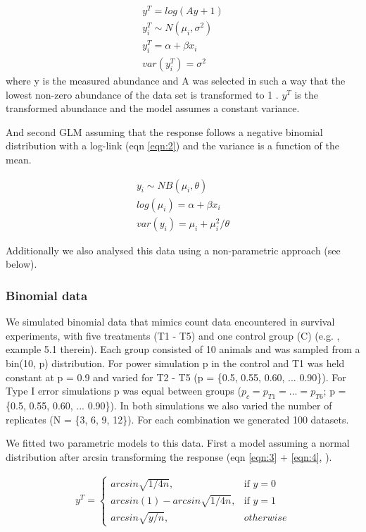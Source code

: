 \documentclass{scrartcl}\usepackage[]{graphicx}\usepackage[]{color}
\begin{document}
\begin{align}
  y^T = log(Ay + 1) \\
  y^T_i \sim N(\mu_i, \sigma^2) \nonumber \\
  y^T_i = \alpha + \beta x_i \label{eqn:1} \\
  var(y^T_i) = \sigma^2 \nonumber
\end{align}
where y is the measured abundance and A was selected in such a way that the lowest non-zero abundance of the data set is transformed to 1 \citep{van_den_brink_impact_2000}. 
$y^T$ is the transformed abundance and the model assumes a constant variance.

And second GLM assuming that the response follows a negative binomial distribution with a log-link (eqn \ref{eqn:2}) and
the variance is a function of the mean.

\begin{align}
  y_i \sim NB(\mu_i, \theta)  \nonumber \\
  log(\mu_i) = \alpha + \beta x_i   \label{eqn:2} \\
  var(y_i) = \mu_i + \mu_i^2 / \theta  \nonumber
\end{align}

Additionally we also analysed this data using a non-parametric approach (see below).

\subsubsection{Binomial data}
We simulated binomial data that mimics count data encountered in survival experiments, with five treatments (T1 - T5) and one control group (C) (e.g. \citep{newman_quantitative_2012}, example 5.1 therein).
Each group consisted of 10 animals and was sampled from a bin(10, p) distribution.
For power simulation p in the control and T1 was held constant at p = 0.9 and varied for T2 - T5  (p = \{0.5, 0.55, 0.60, ... 0.90\}).
For Type I error simulations p was equal between groups ($p_c = p_{T1} = ... = p_{T6}$; p = \{0.5, 0.55, 0.60, ... 0.90\}).
In both simulations we also varied the number of replicates (N = \{3, 6, 9, 12\}).
For each combination we generated 100 datasets.

We fitted two parametric models to this data.
First a model assuming a normal distribution after arcsin transforming the response (eqn \ref{eqn:3} + \ref{eqn:4}, \citep{epa_methods_2002}).

\begin{align}
  y^T = 
  \begin{cases}
    arcsin \sqrt{1/4n}, & \text{if } y = 0 \\
    arcsin(1) - arcsin \sqrt{1/4n}, & \text{if } y = 1 \\
    arcsin \sqrt{y / n}, & otherwise
  \end{cases}
  \label{eqn:3}
\end{align}
\end{document}

